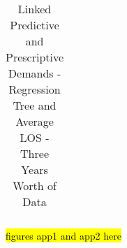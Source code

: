\documentclass[thesis.tex]{subfiles}
\begin{document}
\begin{table}[h!]
{\begin{tabular}{lccccccc}
    \end{tabular}}
    \caption{Linked Predictive and Prescriptive Demands - Regression Tree and Average LOS - Three Years Worth of Data}
    \label{apptab:LinkedDemands1}
\end{table}

\hl{figures app1 and app2 here}

\begin{landscape}

\end{landscape}
\end{document}
